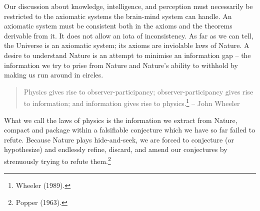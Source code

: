 \begin{multicols}{2}
Our discussion about knowledge, intelligence, and perception must necessarily be restricted to the axiomatic systems the brain-mind system can handle. An axiomatic system must be consistent both in the axioms and the theorems derivable from it. It does not allow an iota of inconsistency. As far as we can tell, the Universe is an axiomatic system; its axioms are inviolable laws of Nature. A desire to understand Nature is an attempt to minimise an information gap – the information we try to prise from Nature and Nature's ability to withhold by making us run around in circles.
\begin{quote}
Physics gives rise to observer-participancy; observer-participancy gives rise to information; and information gives rise to physics.\footnote{Wheeler (1989).}  – John Wheeler
\end{quote}

What we call the laws of physics is the information we extract from Nature, compact and package within a falsifiable conjecture which we have so far failed to refute. Because Nature plays hide-and-seek, we are forced to conjecture (or hypothesize) and endlessly refine, discard, and amend our conjectures by strenuously trying to refute them.\footnote{Popper (1963).} 


\end{multicols}
